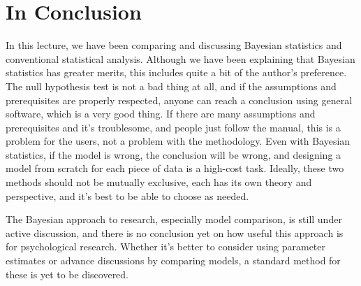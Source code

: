 \documentclass{ltjsbook}
\begin{document}
\section{In Conclusion}
In this lecture, we have been comparing and discussing Bayesian statistics and conventional statistical analysis. Although we have been explaining that Bayesian statistics has greater merits, this includes quite a bit of the author's preference. The null hypothesis test is not a bad thing at all, and if the assumptions and prerequisites are properly respected, anyone can reach a conclusion using general software, which is a very good thing. If there are many assumptions and prerequisites and it's troublesome, and people just follow the manual, this is a problem for the users, not a problem with the methodology. Even with Bayesian statistics, if the model is wrong, the conclusion will be wrong, and designing a model from scratch for each piece of data is a high-cost task. Ideally, these two methods should not be mutually exclusive, each has its own theory and perspective, and it's best to be able to choose as needed.

The Bayesian approach to research, especially model comparison, is still under active discussion, and there is no conclusion yet on how useful this approach is for psychological research.
Whether it's better to consider using parameter estimates or advance discussions by comparing models, a standard method for these is yet to be discovered.
\end{document}
